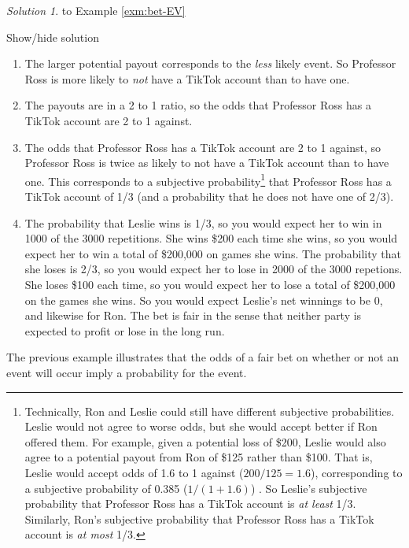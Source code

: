 \documentclass[
]{book}
\providecommand{\tightlist}{%
  \setlength{\itemsep}{0pt}\setlength{\parskip}{0pt}}
\theoremstyle{definition}
\theoremstyle{definition}
\theoremstyle{definition}
\theoremstyle{remark}
\newtheorem*{solution}{Solution}
\begin{document}
\begin{solution}
{}
to Example \ref{exm:bet-EV}
\end{solution}

Show/hide solution

\begin{enumerate}
\def\labelenumi{\arabic{enumi}.}
\tightlist
\item
  The larger potential payout corresponds to the \emph{less} likely event. So Professor Ross is more likely to \emph{not} have a TikTok account than to have one.
\item
  The payouts are in a 2 to 1 ratio, so the odds that Professor Ross has a TikTok account are 2 to 1 against.
\item
  The odds that Professor Ross has a TikTok account are 2 to 1 against, so Professor Ross is twice as likely to not have a TikTok account than to have one. This corresponds to a subjective probability\footnote{Technically, Ron and Leslie could still have different subjective probabilities. Leslie would not agree to worse odds, but she would accept better if Ron offered them. For example, given a potential loss of \$200, Leslie would also agree to a potential payout from Ron of \$125 rather than \$100. That is, Leslie would accept odds of 1.6 to 1 against (\(200/125 = 1.6\)), corresponding to a subjective probability of 0.385 (\(1/(1 + 1.6)\)) . So Leslie's subjective probability that Professor Ross has a TikTok account is \emph{at least} 1/3. Similarly, Ron's subjective probability that Professor Ross has a TikTok account is \emph{at most} 1/3.} that Professor Ross has a TikTok account of 1/3 (and a probability that he does not have one of 2/3).
\item
  The probability that Leslie wins is 1/3, so you would expect her to win in 1000 of the 3000 repetitions. She wins \$200 each time she wins, so you would expect her to win a total of \$200,000 on games she wins. The probability that she loses is 2/3, so you would expect her to lose in 2000 of the 3000 repetions. She loses \$100 each time, so you would expect her to lose a total of \$200,000 on the games she wins. So you would expect Leslie's net winnings to be 0, and likewise for Ron. The bet is fair in the sense that neither party is expected to profit or lose in the long run.
\end{enumerate}

The previous example illustrates that the odds of a fair bet on whether or not an event will occur imply a
probability for the event.
\end{document}
